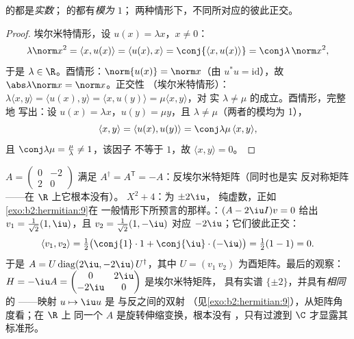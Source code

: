 \begin{proposition}\label{prop:b2:hermitian:eigenvalues}
的都是\emph{实数}；
的都有\emph{模为 $1$}；
两种情形下，不同所对应的彼此正交。
\end{proposition}

\begin{proof}
埃尔米特情形，设 $u(x) = \lambda x$，$x \neq 0$：
\[
\lambda \norm x^2 = \langle x, u(x)\rangle = \langle u(x), x\rangle
= \conj{\langle x, u(x)\rangle} = \conj\lambda\,\norm x^2 ,
\]
于是 $\lambda \in \R$。酉情形：$\norm{u(x)} = \norm x$（由 $u^*u =
\mathrm{id}$），故 $\abs\lambda\norm x = \norm x$。正交性
（埃尔米特情形）：$\lambda\langle x, y\rangle = \langle u(x),
y\rangle = \langle x, u(y)\rangle = \mu\langle x, y\rangle$，对
实 $\lambda \neq \mu$ 的成立。酉情形，完整地
写出：设 $u(x) = \lambda x$，$u(y) = \mu y$，且 $\lambda \neq
\mu$（两者的模均为 1），
\[
\langle x, y\rangle = \langle u(x), u(y)\rangle
= \conj\lambda\mu\,\langle x, y\rangle ,
\]
且 $\conj\lambda\mu = \frac{\mu}{\lambda} \neq 1$，该因子
不等于 $1$，故 $\langle x, y\rangle = 0$。
\end{proof}

\begin{example}[反埃尔米特矩阵的对角化]\label{ex:b2:hermitian:skewexample}
$A = \begin{pmatrix} 0 & -2\\ 2 & 0\end{pmatrix}$ 满足
$A^\dagger = A^{\mathsf T} = -A$：反埃尔米特矩阵（同时也是实
反对称矩阵——在 $\R$ 上它根本没有）。
 $X^2 + 4$：为 $\pm2\iu$，
纯虚数，正如\cref{exo:b2:hermitian:9}在
一般情形下所预言的那样。：$(A - 2\iu I)v = 0$ 给出 $v_1 =
\frac{1}{\sqrt2}(1, \iu)$，且 $v_2 = \frac{1}{\sqrt2}(1,
-\iu)$ 对应 $-2\iu$；它们彼此正交：
\[
\langle v_1, v_2\rangle
= \tfrac12\bigl(\conj{1}\cdot1 +
\conj{\iu}\cdot(-\iu)\bigr)
= \tfrac12(1 - 1) = 0 .
\]
于是 $A = U\operatorname{diag}(2\iu, -2\iu)\,U^\dagger$，其中 $U =
(v_1\ v_2)$ 为酉矩阵。最后的观察：$H = -\iu A =
\begin{pmatrix} 0 & 2\iu\\ -2\iu & 0\end{pmatrix}$ 是埃尔米特矩阵，
具有实谱 $\{\pm2\}$，并具有\emph{相同}的
——映射 $u \mapsto \iu u$ 是
与反之间的双射
（见\cref{exo:b2:hermitian:9}），从矩阵角度看；在 $\R$ 上
同一个 $A$ 是旋转伸缩变换，根本没有
，只有过渡到 $\C$ 才显露其标准形。
\end{example}

